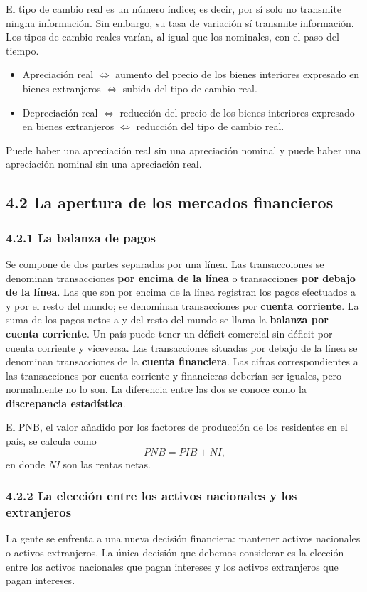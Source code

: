 \documentclass[10pt]{article}
\begin{document}
\begin{multicols*}{2}
El tipo de cambio real es un número índice; es decir, por sí solo no transmite ningna información. Sin embargo, su tasa de variación sí transmite información. Los tipos de cambio reales varían, al igual que los nominales, con el paso del tiempo.

\begin{itemize}
\item Apreciación real $\iff$ aumento del precio de los bienes interiores expresado en bienes extranjeros $\iff$ subida del tipo de cambio real.
\item Depreciación real $\iff$ reducción del precio de los bienes interiores expresado en bienes extranjeros $\iff$ reducción del tipo de cambio real.
\end{itemize}

Puede haber una apreciación real sin una apreciación nominal y puede haber una apreciación nominal sin una apreciación real.

\subsection{4.2 La apertura de los mercados financieros}
\subsubsection{4.2.1 La balanza de pagos}
Se compone de dos partes separadas por una línea. Las transaccoiones se denominan transacciones \textbf{por encima de la línea} o transacciones \textbf{por debajo de la línea}. Las que son por encima de la línea registran los pagos efectuados a y por el resto del mundo; se denominan transacciones por \textbf{cuenta corriente}. La suma de los pagos netos a y del resto del mundo se llama la \textbf{balanza por cuenta corriente}. Un país puede tener un déficit comercial sin déficit por cuenta corriente y viceversa. Las transacciones situadas por debajo de la línea se denominan transacciones de la \textbf{cuenta financiera}. Las cifras correspondientes a las transacciones por cuenta corriente y financieras deberían ser iguales, pero normalmente no lo son. La diferencia entre las dos se conoce como la \textbf{discrepancia estadística}.

El PNB, el valor añadido por los factores de producción de los residentes en el país, se calcula como
\[ \textit{PNB} = \textit{PIB} + \textit{NI},\]
en donde \textit{NI} son las rentas netas.

\subsubsection{4.2.2 La elección entre los activos nacionales y los extranjeros}
La gente se enfrenta a una nueva decisión financiera: mantener activos nacionales o activos extranjeros. La única decisión que debemos considerar es la elección entre los activos nacionales que pagan intereses y los activos extranjeros que pagan intereses.


\end{multicols*}
\end{document}
